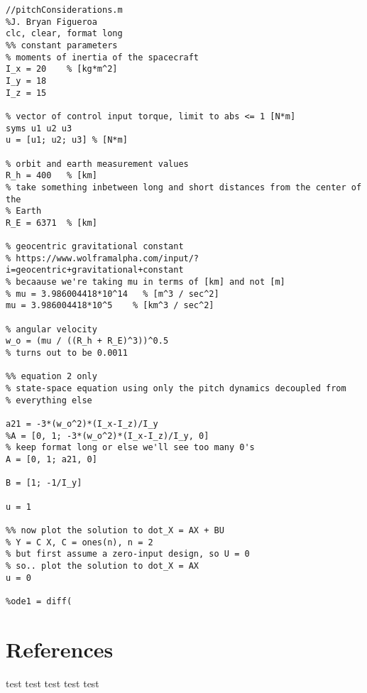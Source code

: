 \documentclass{article}
\begin{document}
\begin{lstlisting}
//pitchConsiderations.m
%J. Bryan Figueroa
clc, clear, format long
%% constant parameters
% moments of inertia of the spacecraft
I_x = 20    % [kg*m^2]
I_y = 18
I_z = 15

% vector of control input torque, limit to abs <= 1 [N*m]
syms u1 u2 u3
u = [u1; u2; u3] % [N*m]

% orbit and earth measurement values
R_h = 400   % [km]
% take something inbetween long and short distances from the center of the
% Earth
R_E = 6371  % [km]

% geocentric gravitational constant
% https://www.wolframalpha.com/input/?i=geocentric+gravitational+constant
% becaause we're taking mu in terms of [km] and not [m]
% mu = 3.986004418*10^14   % [m^3 / sec^2]
mu = 3.986004418*10^5    % [km^3 / sec^2]

% angular velocity
w_o = (mu / ((R_h + R_E)^3))^0.5
% turns out to be 0.0011

%% equation 2 only
% state-space equation using only the pitch dynamics decoupled from
% everything else

a21 = -3*(w_o^2)*(I_x-I_z)/I_y
%A = [0, 1; -3*(w_o^2)*(I_x-I_z)/I_y, 0]
% keep format long or else we'll see too many 0's
A = [0, 1; a21, 0]

B = [1; -1/I_y]

u = 1

%% now plot the solution to dot_X = AX + BU
% Y = C X, C = ones(n), n = 2
% but first assume a zero-input design, so U = 0
% so.. plot the solution to dot_X = AX
u = 0

%ode1 = diff(

\end{lstlisting}

\section{References}
\cite{ruiter} test
\cite{dirac} test
\cite{Markley} test
\cite{einstein} test
\cite{knuth-fa} test
\medskip
\printbibliography
\end{document}
